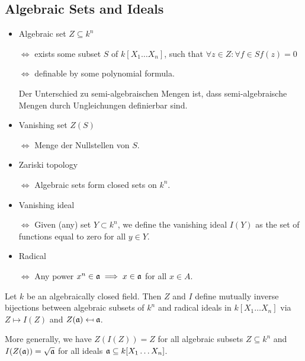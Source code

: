 \subsection{Algebraic Sets and Ideals}

\begin{definition}
    \begin{itemize}
        \item Algebraic set $Z\subseteq k^n$ 
        
        $\iff$ exists some subset $S$ of $k[X_1\ldots X_n]$, such that $\forall z\in Z: \forall f \in S f(z)=0$ 
        
        $\iff$ definable by some polynomial formula. 
        
        Der Unterschied zu semi-algebraischen Mengen ist, dass semi-algebraische Mengen durch Ungleichungen definierbar sind.  
        
        \item Vanishing set $Z(S)$

        $\iff$ Menge der Nullstellen von $S$. 
        
        \item Zariski topology

        $\iff$ Algebraic sets form closed sets on $k^n$.
        
        \item Vanishing ideal

        $\iff$ Given (any) set $Y\subset k^n$, we define the vanishing ideal $I(Y)$ as the set of functions equal to zero for all $y\in Y$.
        
        \item Radical 

        $\iff$ Any power $x^n \in \mathfrak{a} \implies x \in \mathfrak{a}$ for all $x\in A$.
    \end{itemize}
\end{definition}

\begin{theorem}
    Let $k$ be an algebraically closed field. Then $Z$ and $I$ define mutually inverse bijections between algebraic subsets of $k^n$ and radical ideals in $k[X_1\ldots X_n]$ via $Z\mapsto I(Z)$ and $Z(\mathfrak{a})\mapsfrom \mathfrak{a}$. 
    
    More generally, we have $Z(I(Z))=Z$ for all algebraic subsets $Z\subseteq k^n$ and $I(Z(\mathfrak{a}))=\sqrt{\mathfrak{a}}$ for all ideals $\mathfrak{a} \subseteq k[X_1\ldots X_n]$.
\end{theorem}

